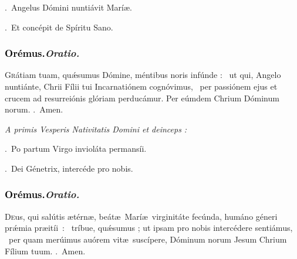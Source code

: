 \documentclass[12pt]{article} %
\newenvironment{rubric}{\vspace{2 mm}\color{benred8} \itshape \leftskip 0in \setlength{\parindent}{0.25in}}{\vspace{2 mm}}
\newenvironment{response}{\leftskip 0in \setlength{\parindent}{0in}}{\vspace{2 mm}}
\let\oldgresixstar\gresixstar
\renewcommand{\gresixstar}{\textcolor{benred8}{\oldgresixstar}}
\let\oldgredagger\gredagger
\renewcommand{\gredagger}{\textcolor{benred8}{\oldgredagger}}
\let\oldVbar\Vbar
\renewcommand{\Vbar}{\textcolor{benred8}{\oldVbar .}}
\let\oldRbar\Rbar
\renewcommand{\Rbar}{\textcolor{benred8}{\oldRbar .}}
\def\capitulumSpace{\hspace{20 mm}}
\begin{document}
\begin{response}
\Vbar\ Angelus D\'{o}mini nunti\'{a}vit Mar\'{i}\ae .

\Rbar\ Et conc\'{e}pit de Sp\'{i}ritu Sano.

\end{response}

\subsubsection*{\textcolor{black}{Or\'{e}mus.}\capitulumSpace \emph{Oratio.}}

\begin{response}\lettrine{G}{r}\'{a}tiam tuam, qu\'{\ae}sumus D\'{o}mine, m\'{e}ntibus noris inf\'{u}nde : \gredagger\ ut qui, Angelo nunti\'{a}nte, Chrii F\'{i}lii tui Incarnati\'{o}nem cogn\'{o}vimus, \gresixstar\ per passi\'{o}nem ejus et crucem ad resurrei\'{o}nis gl\'{o}riam perduc\'{a}mur. Per e\'{u}mdem Chrium D\'{o}minum norum. \Rbar\ Amen.

\end{response}

\begin{rubric}
A primis Vesperis Nativitatis Domini et deinceps :

\end{rubric}

\begin{response}
\Vbar\ Po partum Virgo inviol\'{a}ta permans\'{i}i.

\Rbar\ Dei G\'{e}netrix, interc\'{e}de pro nobis.

\end{response}

\subsubsection*{\textcolor{black}{Or\'{e}mus.}\capitulumSpace \emph{Oratio.}}

\begin{response}\lettrine{D}{e}us, qui sal\'{u}tis \ae t\'{e}rn\ae , be\'{a}t\ae\ Mar\'{i}\ae\ virginit\'{a}te fec\'{u}nda, hum\'{a}no g\'{e}neri pr\'{\ae}mia \mbox{pr\ae{}it\'{i}i : \gredagger} tr\'{i}bue, qu\'{\ae}sumus ; ut ipsam pro nobis interc\'{e}dere senti\'{a}mus, \gresixstar\ per quam mer\'{u}imus au\'{o}rem vit\ae\ susc\'{i}pere, D\'{o}minum norum Jesum Chrium F\'{i}lium tuum. \Rbar\ Amen.

\end{response}
\end{document}

